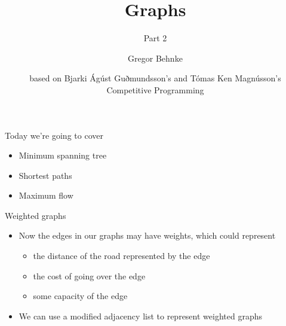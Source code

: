 \documentclass[12pt,t]{beamer}
\title{Graphs}
\subtitle{Part 2}
\author{Gregor Behnke}
\institute{Institute of Artificial Intelligence\\ Ulm University}
\date{\tiny based on Bjarki Ágúst Guðmundsson's and Tómas Ken Magnússon's\\Competitive Programming}
\newcommand{\bi}{\begin{itemize}}
\newcommand{\ei}{\end{itemize}}
\begin{document}
{
    \frame{
        \titlepage
    }
}


\begin{frame}{Today we're going to cover}
    \vspace{50pt}
    \bi
        \item Minimum spanning tree
        \item Shortest paths
        \item Maximum flow
      
    \ei
\end{frame}


\begin{frame}{Weighted graphs}
    \vspace{30pt}
    \bi
        \item Now the edges in our graphs may have weights, which could represent
            \bi
                \item the distance of the road represented by the edge
                \item the cost of going over the edge
                \item some capacity of the edge
            \ei

        \item We can use a modified adjacency list to represent weighted graphs
    \ei
\end{frame}
\end{document}
